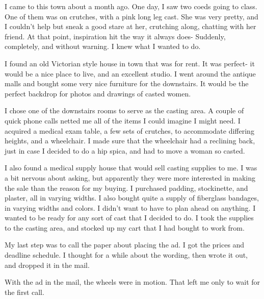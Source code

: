     I came to this town about a month ago. One day, I saw two coeds going to class. One of them
was on crutches, with a pink long leg cast. She was very pretty, and I couldn't help but sneak a
good stare at her, crutching along, chatting with her friend. At that point, inspiration hit the
way it always does- Suddenly, completely, and without warning. I knew what I wanted to do.

    I found an old Victorian style house in town that was for rent. It was perfect- it would be
a nice place to live, and an excellent studio. I went around the antique malls and bought some
very nice furniture for the downstairs. It would be the perfect backdrop for photos and drawings
of casted women.

    I chose one of the downstairs rooms to serve as the casting area. A couple of quick phone
calls netted me all of the items I could imagine I might need. I acquired a medical exam table,
a few sets of crutches, to accommodate differing heights, and a wheelchair. I made sure that the
wheelchair had a reclining back, just in case I decided to do a hip spica, and had to move a
woman so casted.

    I also found a medical supply house that would sell casting supplies to me. I was a bit
nervous about asking, but apparently they were more interested in making the sale than the
reason for my buying. I purchased padding, stockinette, and plaster, all in varying widths. I
also bought quite a supply of fiberglass bandages, in varying widths and colors. I didn't want
to have to plan ahead on anything. I wanted to be ready for any sort of cast that I decided to
do. I took the supplies to the casting area, and stocked up my cart that I had bought to work
from.

    My last step was to call the paper about placing the ad. I got the prices and deadline
schedule. I thought for a while about the wording, then wrote it out, and dropped it in the
mail.

    With the ad in the mail, the wheels were in motion. That left me only to wait for the first
call.

